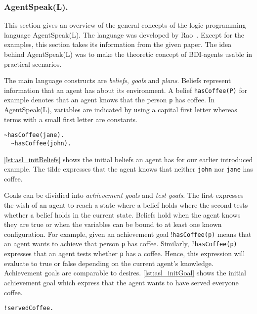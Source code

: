 \subsubsection{AgentSpeak(L).}
This section gives an overview of the general concepts of the logic programming language AgentSpeak(L). The language was developed by Rao~\cite{rao_agentspeak_1996}. Except for the examples, this section takes its information from the given paper. The idea behind AgentSpeak(L) was to make the theoretic concept of BDI-agents usable in practical scenarios. %

The main language constructs are \emph{beliefs}, \emph{goals} and \emph{plans}. Beliefs represent information that an agent has about its environment. A belief \texttt{hasCoffee(P)} for example denotes that an agent knows that the person \texttt{p} has coffee. In AgentSpeak(L), variables are indicated by using a capital first letter whereas terms with a small first letter are constants. %
\begin{lstlisting}[caption={Initial beliefs.}, label=lst:asl_initBeliefs]
  ~hasCoffee(jane).
  ~hasCoffee(john).
\end{lstlisting}
\autoref{lst:asl_initBeliefs} shows the initial beliefs an agent has for our earlier introduced example. The tilde expresses that the agent knows that neither \texttt{john} nor \texttt{jane} has coffee. %

Goals can be dividied into \emph{achievement goals} and \emph{test goals}. The first expresses the wish of an agent to reach a state where a belief holds where the second tests whether a belief holds in the current state. Beliefs hold when the agent knows they are true or when the variables can be bound to at least one known configuration. For example, given an achievement goal !\texttt{hasCoffee(p)} means that an agent wants to achieve that person \texttt{p} has coffee. Similarly, ?\texttt{hasCoffee(p)} expresses that an agent tests whether \texttt{p} has a coffee. Hence, this expression will evaluate to true or false depending on the current agent's knowledge.
Achievement goals are comparable to desires. %
\autoref{lst:asl_initGoal} shows the initial achievement goal which express that the agent wants to have served everyone coffee.
\begin{lstlisting}[firstnumber=3, caption={Initial goal.}, label=lst:asl_initGoal]
  !servedCoffee.
\end{lstlisting}

